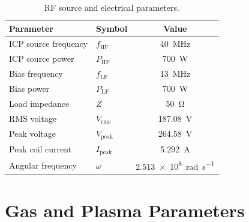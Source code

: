 \documentclass[11pt,a4paper]{report}
\begin{document}
\begin{table}[H]
\centering
\caption{RF source and electrical parameters.}
\label{tab:app-rf}
\begin{tabular}{@{}llc@{}}
\toprule
\textbf{Parameter} & \textbf{Symbol} & \textbf{Value} \\
\midrule
ICP source frequency           & $f_\mathrm{HF}$           & \SI{40}{\mega\hertz} \\
ICP source power               & $P_\mathrm{HF}$           & \SI{700}{\watt} \\
Bias frequency                 & $f_\mathrm{LF}$           & \SI{13}{\mega\hertz} \\
Bias power                     & $P_\mathrm{LF}$           & \SI{700}{\watt} \\
Load impedance                 & $Z$                        & \SI{50}{\ohm} \\
RMS voltage                    & $V_\mathrm{rms}$          & \SI{187.08}{\volt} \\
Peak voltage                   & $V_\mathrm{peak}$         & \SI{264.58}{\volt} \\
Peak coil current              & $I_\mathrm{peak}$         & \SI{5.292}{\ampere} \\
Angular frequency              & $\omega$                   & \SI{2.513e8}{\radian\per\second} \\
\bottomrule
\end{tabular}
\end{table}


\section{Gas and Plasma Parameters}
\label{app:plasma}
\end{document}
